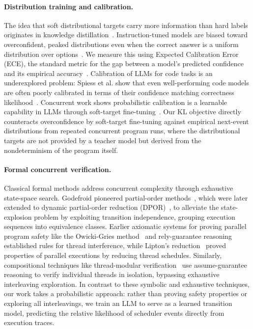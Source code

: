\documentclass[10pt,conference]{IEEEtran}
\begin{document}
\paragraph{Distribution training and calibration.}
The idea that soft distributional targets carry more information than hard labels originates in knowledge distillation~\cite{hinton}. Instruction-tuned models are biased toward overconfident, peaked distributions even when the correct answer is a uniform distribution over options~\cite{diffuse}. We measure this using Expected Calibration Error (ECE), the standard metric for the gap between a model's predicted confidence and its empirical accuracy~\cite{guocalib}. Calibration of LLMs for code tasks is an underexplored problem: Spiess et al. show that even well-performing code models are often poorly calibrated in terms of their confidence matching correctness likelihood~\cite{spiess}. Concurrent work shows probabilistic calibration is a learnable capability in LLMs through soft-target fine-tuning~\cite{probcalib}. Our KL objective directly counteracts overconfidence by soft-target fine-tuning against empirical next-event distributions from repeated concurrent program runs, where the distributional targets are not provided by a teacher model but derived from the nondeterminism of the program itself.

\paragraph{Formal concurrent verification.}
Classical formal methods address concurrent complexity through exhaustive state-space search. Godefroid pioneered partial-order methods~\cite{godefroid1996}, which were later extended to dynamic partial-order reduction (DPOR)~\cite{flanagan2005dynamic}, to alleviate the state-explosion problem by exploiting transition independence, grouping execution sequences into equivalence classes. Earlier axiomatic systems for proving parallel program safety like the Owicki-Gries method~\cite{Owicki1976} and rely-guarantee reasoning~\cite{Jones1983} established rules for thread interference, while Lipton's reduction~\cite{Lipton1975} proved properties of parallel executions by reducing thread schedules. Similarly, compositional techniques like thread-modular verification~\cite{flanagan2002} use assume-guarantee reasoning to verify individual threads in isolation, bypassing exhaustive interleaving exploration. In contrast to these symbolic and exhaustive techniques, our work takes a probabilistic approach: rather than proving safety properties or exploring all interleavings, we train an LLM to serve as a learned transition model, predicting the relative likelihood of scheduler events directly from execution traces.
\end{document}
